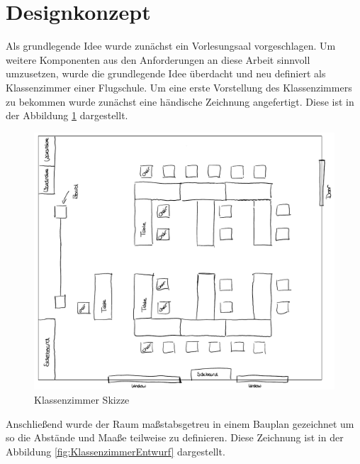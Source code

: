 \section{Designkonzept}



Als grundlegende Idee wurde zunächst ein Vorlesungsaal vorgeschlagen.
Um weitere Komponenten aus den Anforderungen an diese Arbeit sinnvoll umzusetzen,
wurde die grundlegende Idee überdacht und neu definiert als Klassenzimmer einer Flugschule.
\newparagraph
Um eine erste Vorstellung des Klassenzimmers zu bekommen wurde zunächst eine händische Zeichnung angefertigt.
Diese ist in der Abbildung \ref{fig:KlassenzimmerSkizze} dargestellt.
\begin{figure}[H]
  \centering
  \includegraphics[width=1\textwidth]{images/roomModel_OneNote.pdf}
  \caption{Klassenzimmer Skizze}
  \label{fig:KlassenzimmerSkizze}
\end{figure}\noindent
Anschließend wurde der Raum maßstabsgetreu in einem Bauplan gezeichnet um so die Abstände und Maaße teilweise zu definieren.
Diese Zeichnung ist in der Abbildung \ref{fig:KlassenzimmerEntwurf} dargestellt.

